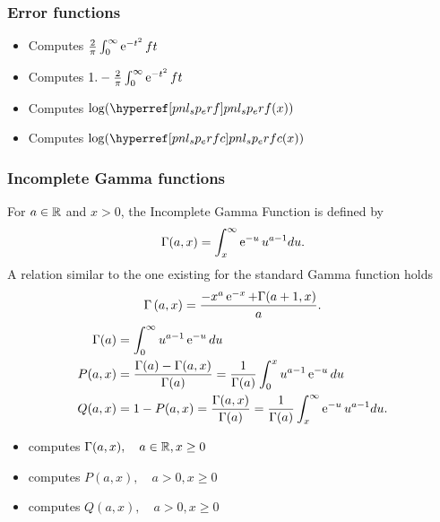 \subsubsection{Error functions}

\begin{itemize}
\item {}
  \sshortdescribe Computes $\frac{2}{\pi}\int_0^\infty \operatorname{e}^{ -t^2 } ft$
\item {}
  \sshortdescribe Computes $1. - \frac{2}{\pi}\int_0^\infty \operatorname{e}^{ -t^2 } ft$
\item {}
  \sshortdescribe Computes $\log(\reffun{pnl_sp_erf} (x))$
\item {}
  \sshortdescribe Computes $\log(\reffun{pnl_sp_erfc} (x))$
\end{itemize}

\subsubsection{Incomplete Gamma functions}

For $a \in {\mathbb R}$ and $x>0$, the Incomplete Gamma Function is defined by
\begin{equation*}
  \Gamma(a, x)=\int_x^{\infty} \operatorname{e}^{ -u } u^{a-1} du.
\end{equation*}
A relation similar to the one existing for the standard Gamma function holds
\begin{equation*}
  \Gamma\left( a, x \right)= \frac{- x^{a} \operatorname{e}^{ -x } + \Gamma (a+1, x)}{a}.
\end{equation*}
\begin{align*}
  \Gamma(a)&=\int_0^{\infty} u^{a-1} \operatorname{e}^{ -u }du\\ 
  P(a, x) &= \frac{\Gamma(a) - \Gamma(a, x)}{\Gamma(a)} =
  \frac{1}{\Gamma(a)} \int_0^x u^{a-1} \operatorname{e}^{ -u }  du\\ 
  Q(a, x) &= 1-P(a, x) =\frac{\Gamma(a, x)}{\Gamma(a)} =
  \frac{1}{\Gamma(a)} \int_x^{\infty} \operatorname{e}^{ -u } u^{a-1} du. 
\end{align*}

\begin{itemize}
\item {}
  \sshortdescribe   computes $\Gamma(a, x), \quad a \in {\mathbb R} , x \geq 0$
\item {}
  \sshortdescribe  computes $P(a, x), \quad a > 0 , x \geq 0$
\item {}
  \sshortdescribe  computes $Q(a, x), \quad a > 0 , x \geq 0$
\end{itemize}

